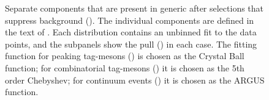 \begin{figure}[hbtp!]
    \centering
    \caption{\label{fig:tag_component_fits} Separate components that are present in generic \MC after selections that suppress background ().
    The individual components are defined in the text of .
    Each distribution contains an unbinned fit to the data points, and the subpanels show the pull () in each case.
    The fitting function for peaking tag-\B mesons () is chosen as the Crystal Ball function;
    for combinatorial tag-\B mesons () it is chosen as the 5th order Chebyshev;
    for continuum \epem\ra\qqbar events () it is chosen as the ARGUS function.
    }
\end{figure}

